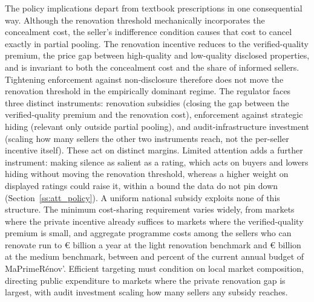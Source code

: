 The policy implications depart from textbook prescriptions in one consequential way. Although the renovation threshold mechanically incorporates the concealment cost, the seller's indifference condition causes that cost to cancel exactly in partial pooling. The renovation incentive reduces to the verified-quality premium, the price gap between high-quality and low-quality disclosed properties, and is invariant to both the concealment cost and the share of informed sellers. Tightening enforcement against non-disclosure therefore does not move the renovation threshold in the empirically dominant regime. The regulator faces three distinct instruments: renovation subsidies (closing the gap between the verified-quality premium and the renovation cost), enforcement against strategic hiding (relevant only outside partial pooling), and audit-infrastructure investment (scaling how many sellers the other two instruments reach, not the per-seller incentive itself). These act on distinct margins. Limited attention adds a further instrument: making silence as salient as a rating, which acts on buyers and lowers hiding without moving the renovation threshold, whereas a higher weight on displayed ratings could raise it, within a bound the data do not pin down (Section~\ref{ss:att_policy}). %
 A uniform national subsidy exploits none of this structure. The minimum cost-sharing requirement varies widely, from markets where the private incentive already suffices to markets where the verified-quality premium is small, and aggregate programme costs among the sellers who can renovate run to \euro{}\attScCostBaseTotTwoFifty{} billion a year at the light renovation benchmark and \euro{}\attScCostBaseTotFiveHundred{} billion at the medium benchmark, between \attScCostBaseTotTwoFiftyLo{} and \attScCostBaseTotFiveHundredHi{} percent of the current annual budget of MaPrimeR\'enov'. Efficient targeting must condition on local market composition, directing public expenditure to markets where the private renovation gap is largest, with audit investment scaling how many sellers any subsidy reaches.
